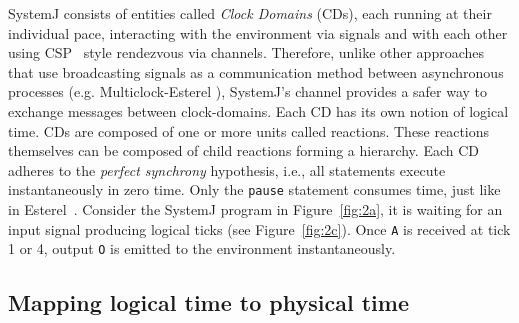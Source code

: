 SystemJ consists of entities called \textit{Clock Domains} (CDs), each
running at their individual pace, interacting with the environment via
signals and with each other using CSP~\cite{choa85} style rendezvous via
channels. Therefore, unlike other approaches that use broadcasting
signals as a communication method between asynchronous processes (e.g.
Multiclock-Esterel \cite{multiesterel}), SystemJ's channel provides a
safer way to exchange messages between clock-domains. Each CD has its
own notion of logical time. CDs are composed of one or more units called
reactions.  These reactions themselves can be composed of child
reactions forming a hierarchy. Each CD adheres to the \textit{perfect
synchrony} hypothesis, i.e., all statements execute instantaneously in
zero time. Only the \texttt{pause} statement consumes time, just like in
Esterel~\cite{gber931}. Consider the SystemJ program in
Figure~\ref{fig:2a}, it is waiting for an input signal producing logical
ticks (see Figure~\ref{fig:2c}). Once \texttt{A} is received at tick 1
or 4, output \texttt{O} is emitted to the environment instantaneously.

\subsection{Mapping logical time to physical time}
\label{sec:mapping-logical-time}

